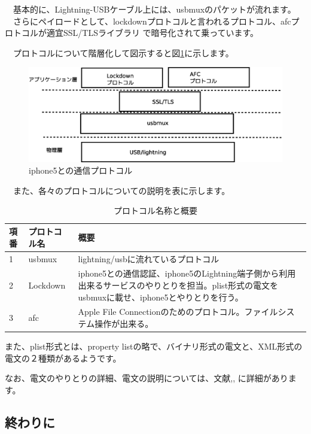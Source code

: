 \documentclass[mingoth,a4paper]{jsarticle}
\begin{document}
　基本的に、Lightning-USBケーブル上には、usbmuxのパケットが流れます。
　さらにペイロードとして、lockdownプロトコルと言われるプロトコル、afcプロトコルが適宜SSL/TLSライブラリ
で暗号化されて乗っています。

　プロトコルについて階層化して図示すると図\ref{fig:iphone-protocol-layerd}に示します。

\begin{figure}[H]
\begin{center}
 \includegraphics[width=0.8\hsize]{image201403/iphone-protocol-layerd.eps}
 \caption{iphone5との通信プロトコル}\label{fig:iphone-protocol-layerd}
\end{center}
\end{figure}

　また、各々のプロトコルについての説明を表に示します。

\begin{table}[ht]
\begin{center}
\begin{tabular}{|l|l|p{7cm}|}
\hline 
項番 & プロトコル名 & 概要 \\ \hline
1 & usbmux & lightning/usbに流れているプロトコル\\ \hline
2 & Lockdown & iphone5との通信認証、iphone5のLightning端子側から利用出来るサービスのやりとりを担当。plist形式の電文をusbmuxに載せ、iphone5とやりとりを行う。 \\ \hline
3 & afc & Apple File Connectionのためのプロトコル。ファイルシステム操作が出来る。\\ \hline
\end{tabular}
\caption{プロトコル名称と概要}\label{tab:iphone5-protocol-overview}
\end{center}
\end{table}

 また、plist形式とは、property listの略で、バイナリ形式の電文と、XML形式の電文の２種類があるようです。

 なお、電文のやりとりの詳細、電文の説明については、文献\cite{usb-mux-desc},\cite{afc-desc},
\cite{iphone-hacking-accessories-desc}に詳細があります。

\subsection{終わりに}
\end{document}

